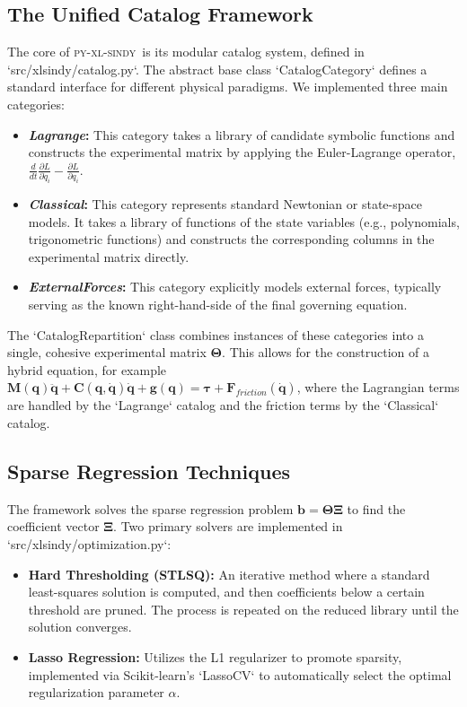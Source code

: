 \documentclass[12pt]{article}
\newcommand{\frameworkname}{\textsc{py-xl-sindy}}
\newcommand{\lagrangecat}{\textit{Lagrange}}
\newcommand{\classicalcat}{\textit{Classical}}
\newcommand{\forcescat}{\textit{ExternalForces}}
\begin{document}
\subsection*{The Unified Catalog Framework}
The core of \frameworkname\ is its modular catalog system, defined in `src/xlsindy/catalog.py`. The abstract base class `CatalogCategory` defines a standard interface for different physical paradigms. We implemented three main categories:
\begin{itemize}
    \item \textbf{\lagrangecat:} This category takes a library of candidate symbolic functions and constructs the experimental matrix by applying the Euler-Lagrange operator, $\frac{d}{dt}\frac{\partial L}{\partial \dot{q}_i} - \frac{\partial L}{\partial q_i}$.
    \item \textbf{\classicalcat:} This category represents standard Newtonian or state-space models. It takes a library of functions of the state variables (e.g., polynomials, trigonometric functions) and constructs the corresponding columns in the experimental matrix directly.
    \item \textbf{\forcescat:} This category explicitly models external forces, typically serving as the known right-hand-side of the final governing equation.
\end{itemize}
The `CatalogRepartition` class combines instances of these categories into a single, cohesive experimental matrix $\mathbf{\Theta}$. This allows for the construction of a hybrid equation, for example $\mathbf{M}(\mathbf{q})\ddot{\mathbf{q}} + \mathbf{C}(\mathbf{q},\dot{\mathbf{q}})\dot{\mathbf{q}} + \mathbf{g}(\mathbf{q}) = \mathbf{\tau} + \mathbf{F}_{friction}(\dot{\mathbf{q}})$, where the Lagrangian terms are handled by the `Lagrange` catalog and the friction terms by the `Classical` catalog.

\subsection*{Sparse Regression Techniques}
The framework solves the sparse regression problem $\mathbf{b} = \mathbf{\Theta}\mathbf{\Xi}$ to find the coefficient vector $\mathbf{\Xi}$. Two primary solvers are implemented in `src/xlsindy/optimization.py`:
\begin{itemize}
    \item \textbf{Hard Thresholding (STLSQ):} An iterative method where a standard least-squares solution is computed, and then coefficients below a certain threshold are pruned. The process is repeated on the reduced library until the solution converges.
    \item \textbf{Lasso Regression:} Utilizes the L1 regularizer to promote sparsity, implemented via Scikit-learn's `LassoCV` to automatically select the optimal regularization parameter $\alpha$.
\end{itemize}
\end{document}
